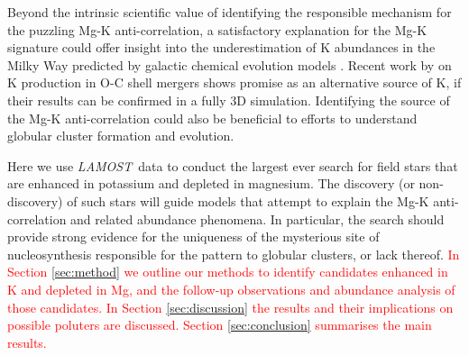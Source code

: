 \documentclass[a4paper,fleqn,usenatbib]{mnras}
\newcommand{\todo}[1]{\textcolor{red}{#1}}
\newcommand{\LamostGiants}{454180}
\newcommand{\project}[1]{\emph{#1}}
\newcommand{\lamost}{\project{LAMOST}}
\begin{document}

Beyond the intrinsic scientific value of identifying the responsible mechanism for the puzzling Mg-K anti-correlation, a satisfactory explanation for the Mg-K signature could offer insight into the underestimation of K abundances in the Milky Way predicted by galactic chemical evolution models \citep{kobayashi2011}. Recent work by \cite{ritter2017} on K production in O-C shell mergers shows promise as an alternative source of K, if their results can be confirmed in a fully 3D simulation. Identifying the source of the Mg-K anti-correlation could also be beneficial to efforts to understand globular cluster formation and evolution.

Here we use \lamost\ data to conduct the largest ever search for field stars that are enhanced in potassium and depleted in magnesium. The discovery (or non-discovery) of such stars will guide models that attempt to explain the Mg-K anti-correlation and related abundance phenomena. In particular, the search should provide strong evidence for the uniqueness of the mysterious site of nucleosynthesis responsible for the pattern to globular clusters, or lack thereof. \todo{ In Section \ref{sec:method} we outline our methods to identify candidates enhanced in K and depleted in Mg, and the follow-up observations and abundance analysis of those candidates. In Section \ref{sec:discussion} the results and their implications on possible poluters are discussed. Section \ref{sec:conclusion} summarises the main results.}


\end{document}

